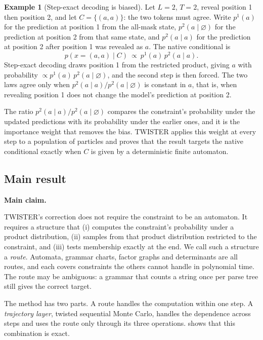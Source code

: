 \documentclass[11pt]{article}
\theoremstyle{definition}
\newtheorem{example}[theorem]{Example}
\newenvironment{claimbox}[1]
  {\begin{mdframed}[linewidth=0.6pt,roundcorner=2pt,backgroundcolor=black!3,
    innertopmargin=6pt,innerbottommargin=6pt]\textbf{#1}\par\smallskip}
  {\end{mdframed}}
\begin{document}
\begin{example}[Step-exact decoding is biased]\label{ex:bias}
Let $L=2$, $T=2$, reveal position 1 then position 2, and let $C=\{(a,a)\}$: the two tokens must agree. Write
$p^1(a)$ for the prediction at position 1 from the all-mask state, $p^2(a\mid\varnothing)$ for the prediction at
position 2 from that same state, and $p^2(a\mid a)$ for the prediction at position 2 after position 1 was revealed
as $a$. The native conditional is
\[
  p(x=(a,a)\mid C)\ \propto\ p^1(a)\,p^2(a\mid a).
\]
Step-exact decoding draws position 1 from the restricted product, giving $a$ with probability
$\propto p^1(a)\,p^2(a\mid\varnothing)$, and the second step is then forced. The two laws agree only when
$p^2(a\mid a)/p^2(a\mid\varnothing)$ is constant in $a$, that is, when revealing position 1 does not change the
model's prediction at position 2.
\end{example}

The ratio $p^2(a\mid a)/p^2(a\mid\varnothing)$ compares the constraint's probability under the updated predictions
with its probability under the earlier ones, and it is the importance weight that removes the bias. TWISTER
\cite{twister} applies this weight at every step to a population of particles and proves that the result targets
the native conditional exactly when $C$ is given by a deterministic finite automaton.

\subsection{Main result}

\begin{claimbox}{Main claim.}
TWISTER's correction does not require the constraint to be an automaton. It requires a structure that
(i) computes the constraint's probability under a product distribution, (ii) samples from that product
distribution restricted to the constraint, and (iii) tests membership exactly at the end. We call such a
structure a \emph{route}. Automata, grammar charts, factor graphs and determinants are all routes, and each
covers constraints the others cannot handle in polynomial time. The route may be ambiguous: a grammar that counts
a string once per parse tree still gives the correct target.
\end{claimbox}

The method has two parts. A route handles the computation within one step. A \emph{trajectory layer}, twisted
sequential Monte Carlo, handles the dependence across steps and uses the route only through its three
operations.  shows that this combination is exact.
\end{document}
